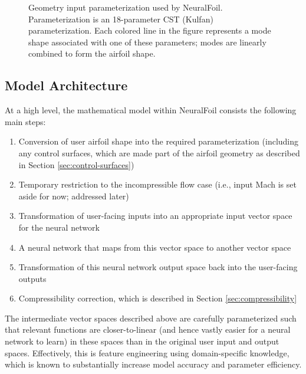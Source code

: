 \documentclass[conf]{new-aiaa}
\begin{document}
    \begin{figure}[h]
        \centering
        \caption{Geometry input parameterization used by NeuralFoil. Parameterization is an 18-parameter CST (Kulfan) parameterization. Each colored line in the figure represents a mode shape associated with one of these parameters; modes are linearly combined to form the airfoil shape.}
        \label{fig:neuralfoil_parameterization}
    \end{figure}

    \subsection{Model Architecture}

    At a high level, the mathematical model within NeuralFoil consists the following main steps:

    \begin{enumerate}
        \item Conversion of user airfoil shape into the required parameterization (including any control surfaces, which are made part of the airfoil geometry as described in Section \ref{sec:control-surfaces})
        \item Temporary restriction to the incompressible flow case (i.e., input Mach is set aside for now; addressed later)
        \item Transformation of user-facing inputs into an appropriate input vector space for the neural network
        \item A neural network that maps from this vector space to another vector space
        \item Transformation of this neural network output space back into the user-facing outputs
        \item Compressibility correction, which is described in Section \ref{sec:compressibility}
    \end{enumerate}

    The intermediate vector spaces described above are carefully parameterized such that relevant functions are closer-to-linear (and hence vastly easier for a neural network to learn) in these spaces than in the original user input and output spaces. Effectively, this is feature engineering using domain-specific knowledge, which is known to substantially increase model accuracy and parameter efficiency.
\end{document}
